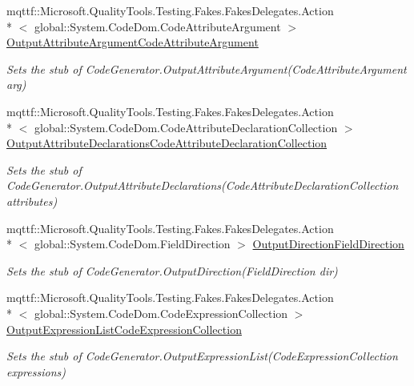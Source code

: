 \begin{DoxyCompactItemize}
mqttf\-::\-Microsoft.\-Quality\-Tools.\-Testing.\-Fakes.\-Fakes\-Delegates.\-Action\\*
$<$ global\-::\-System.\-Code\-Dom.\-Code\-Attribute\-Argument $>$ \hyperlink{class_system_1_1_code_dom_1_1_compiler_1_1_fakes_1_1_stub_code_compiler_a7eeeb088d329e80dc4cb891f8155b577}{Output\-Attribute\-Argument\-Code\-Attribute\-Argument}
\begin{DoxyCompactList}\small\item\em Sets the stub of Code\-Generator.\-Output\-Attribute\-Argument(\-Code\-Attribute\-Argument arg)\end{DoxyCompactList}\item 
mqttf\-::\-Microsoft.\-Quality\-Tools.\-Testing.\-Fakes.\-Fakes\-Delegates.\-Action\\*
$<$ global\-::\-System.\-Code\-Dom.\-Code\-Attribute\-Declaration\-Collection $>$ \hyperlink{class_system_1_1_code_dom_1_1_compiler_1_1_fakes_1_1_stub_code_compiler_a7d92491628971b4c47682aea0ab250a9}{Output\-Attribute\-Declarations\-Code\-Attribute\-Declaration\-Collection}
\begin{DoxyCompactList}\small\item\em Sets the stub of Code\-Generator.\-Output\-Attribute\-Declarations(\-Code\-Attribute\-Declaration\-Collection attributes)\end{DoxyCompactList}\item 
mqttf\-::\-Microsoft.\-Quality\-Tools.\-Testing.\-Fakes.\-Fakes\-Delegates.\-Action\\*
$<$ global\-::\-System.\-Code\-Dom.\-Field\-Direction $>$ \hyperlink{class_system_1_1_code_dom_1_1_compiler_1_1_fakes_1_1_stub_code_compiler_a58a9699a16621f2af4096feaa900bac9}{Output\-Direction\-Field\-Direction}
\begin{DoxyCompactList}\small\item\em Sets the stub of Code\-Generator.\-Output\-Direction(\-Field\-Direction dir)\end{DoxyCompactList}\item 
mqttf\-::\-Microsoft.\-Quality\-Tools.\-Testing.\-Fakes.\-Fakes\-Delegates.\-Action\\*
$<$ global\-::\-System.\-Code\-Dom.\-Code\-Expression\-Collection $>$ \hyperlink{class_system_1_1_code_dom_1_1_compiler_1_1_fakes_1_1_stub_code_compiler_adf052893b377b1d981671da9598d5330}{Output\-Expression\-List\-Code\-Expression\-Collection}
\begin{DoxyCompactList}\small\item\em Sets the stub of Code\-Generator.\-Output\-Expression\-List(\-Code\-Expression\-Collection expressions)\end{DoxyCompactList}\item 

\end{DoxyCompactItemize}
